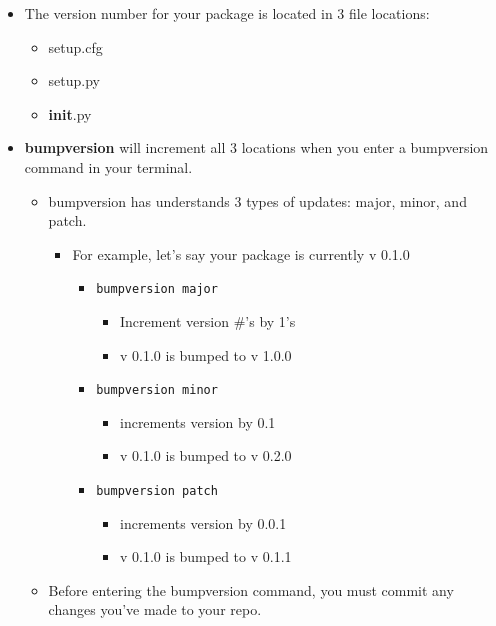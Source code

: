 \documentclass[11pt]{article}
\providecommand{\tightlist}{%
      \setlength{\itemsep}{0pt}\setlength{\parskip}{0pt}}
\begin{document}
\begin{itemize}
\tightlist
\item
  The version number for your package is located in 3 file locations:

  \begin{itemize}
  \tightlist
  \item
    setup.cfg
  \item
    setup.py
  \item
    \textbf{init}.py
  \end{itemize}
\item
  \textbf{bumpversion} will increment all 3 locations when you enter a
  bumpversion command in your terminal.

  \begin{itemize}
  \tightlist
  \item
    bumpversion has understands 3 types of updates: major, minor, and
    patch.

    \begin{itemize}
    \tightlist
    \item
      For example, let's say your package is currently v 0.1.0

      \begin{itemize}
      \tightlist
      \item
        \texttt{bumpversion\ major}

        \begin{itemize}
        \tightlist
        \item
          Increment version \#'s by 1's
        \item
          v 0.1.0 is bumped to v 1.0.0
        \end{itemize}
      \item
        \texttt{bumpversion\ minor}

        \begin{itemize}
        \tightlist
        \item
          increments version by 0.1
        \item
          v 0.1.0 is bumped to v 0.2.0
        \end{itemize}
      \item
        \texttt{bumpversion\ patch}

        \begin{itemize}
        \tightlist
        \item
          increments version by 0.0.1
        \item
          v 0.1.0 is bumped to v 0.1.1
        \end{itemize}
      \end{itemize}
    \end{itemize}
  \item
    Before entering the bumpversion command, you must commit any changes
    you've made to your repo.


\end{itemize}
\end{itemize}
\end{document}
